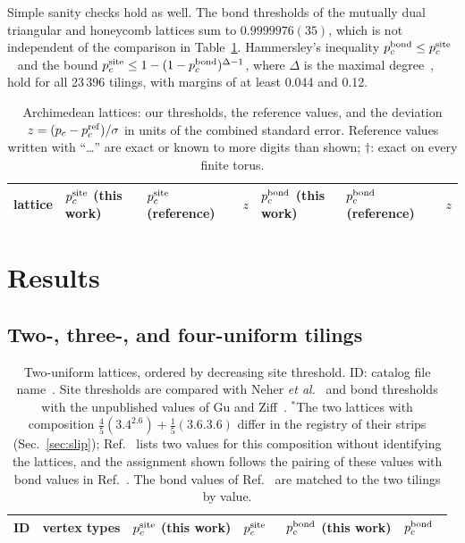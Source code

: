 \documentclass[pre,twocolumn,superscriptaddress,longbibliography,floatfix]{revtex4-2}
\newcommand{\pc}{p_c}
\newcommand{\ps}{p_c^{\rm site}}
\newcommand{\pb}{p_c^{\rm bond}}
\begin{document}
Simple sanity checks hold as well. The bond thresholds of the mutually dual triangular and honeycomb lattices sum to $0.9999976(35)$, which is not independent of the comparison in Table~\ref{tab:arch}. Hammersley's inequality $\pb\le\ps$~\cite{Hammersley61} and the bound $\ps\le1-(1-\pb)^{\Delta-1}$, where $\Delta$ is the maximal degree~\cite{GrimmettStacey98}, hold for all 23\,396 tilings, with margins of at least 0.044 and 0.12.

\begin{table}
\caption{Archimedean lattices: our thresholds, the reference values, and the deviation $z=(\pc-p_c^{\rm ref})/\sigma$ in units of the combined standard error. Reference values written with ``\ldots'' are exact or known to more digits than shown; $\dagger$: exact on every finite torus.}
\label{tab:arch}
\begin{ruledtabular}
\begin{tabular}{lllrllr}
lattice & $\ps$ (this work) & $\ps$ (reference) & $z$ & $\pb$ (this work) & $\pb$ (reference) & $z$\\
\hline

\end{tabular}
\end{ruledtabular}
\end{table}

\section{Results}\label{sec:results}

\subsection{Two-, three-, and four-uniform tilings}

\begin{table}
\caption{Two-uniform lattices, ordered by decreasing site threshold. ID: catalog file name~\cite{TesCatalog}. Site thresholds are compared with Neher \textit{et al.}~\cite{Neher08supp} and bond thresholds with the unpublished values of Gu and Ziff~\cite{GuZiff}. $^\ast$The two lattices with composition $\tfrac45(3.4^2.6)+\tfrac15(3.6.3.6)$ differ in the registry of their strips (Sec.~\ref{sec:slip}); Ref.~\cite{Neher08supp} lists two values for this composition without identifying the lattices, and the assignment shown follows the pairing of these values with bond values in Ref.~\cite{Lebrecht21}. The bond values of Ref.~\cite{GuZiff} are matched to the two tilings by value.}
\label{tab:2uni}
\begin{ruledtabular}
\begin{tabular}{llllll}
ID & vertex types & $\ps$ (this work) & $\ps$~\cite{Neher08supp} & $\pb$ (this work) & $\pb$~\cite{GuZiff}\\
\hline

\end{tabular}
\end{ruledtabular}
\end{table}
\end{document}
